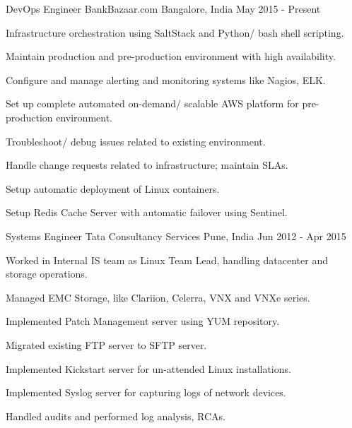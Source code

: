 

\begin{cventries}

  \cventry
    {DevOps Engineer} %
    {BankBazaar.com} %
    {Bangalore, India} %
    {May 2015 - Present} %
    {
      \begin{cvitems} %
        \item {Infrastructure orchestration using SaltStack and Python/ bash shell scripting.}
        \item {Maintain production and pre-production environment with high availability.}
        \item {Configure and manage alerting and monitoring systems like Nagios, ELK.}
        \item {Set up complete automated on-demand/ scalable AWS platform for pre-production environment.}
        \item {Troubleshoot/ debug issues related to existing environment.}
        \item {Handle change requests related to infrastructure; maintain SLAs.}
        \item {Setup automatic deployment of Linux containers.}
        \item {Setup Redis Cache Server with automatic failover using Sentinel.}
      \end{cvitems}
    }

  \cventry
    {Systems Engineer} %
    {Tata Consultancy Services} %
    {Pune, India} %
    {Jun 2012 - Apr 2015} %
    {
      \begin{cvitems} %
        \item {Worked in Internal IS team as Linux Team Lead, handling datacenter and storage operations.}
        \item {Managed EMC Storage, like Clariion, Celerra, VNX and VNXe series.}
        \item {Implemented Patch Management server using YUM repository.}
        \item {Migrated existing FTP server to SFTP server.}
        \item {Implemented Kickstart server for un-attended Linux installations.}
        \item {Implemented Syslog server for capturing logs of network devices.}
        \item {Handled audits and performed log analysis, RCAs.}
      \end{cvitems}
    }


\end{cventries}
